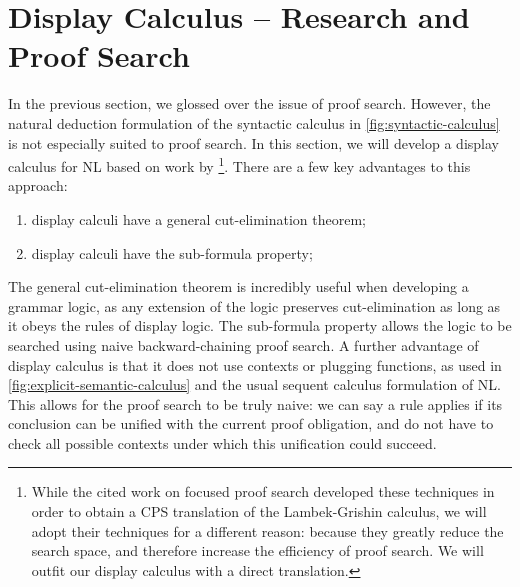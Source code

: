 \documentclass[a4paper]{article}
\begin{document}
\section{Display Calculus -- Research and Proof Search}\label{sec:display-calculus}
In the previous section, we glossed over the issue of proof
search. However, the natural deduction formulation of the syntactic
calculus in \autoref{fig:syntactic-calculus} is not especially suited
to proof search.
In this section, we will develop a display calculus
\citep{belnap1982} for NL based on work by
\citet{bernardi2010,bastenhof2012}\footnote{%
  While the cited work on focused proof search developed these
  techniques in order to obtain a CPS translation of the
  Lambek-Grishin calculus, we will adopt their techniques for a
  different reason: because they greatly reduce the search space, and
  therefore increase the efficiency of proof search. We will outfit
  our display calculus with a direct translation.
}. There are a few key advantages to this approach:
\begin{enumerate}
\item display calculi have a general cut-elimination theorem;
\item display calculi have the sub-formula property;
\end{enumerate}
The general cut-elimination theorem is incredibly useful when
developing a grammar logic, as any extension of the logic preserves
cut-elimination as long as it obeys the rules of display logic.
The sub-formula property allows the logic to be searched using naive
backward-chaining proof search. A further advantage of display
calculus is that it does not use contexts or plugging functions, as
used in \autoref{fig:explicit-semantic-calculus} and the usual sequent
calculus formulation of NL. This allows for the proof search to be
truly naive: we can say a rule applies if its conclusion can be
unified with the current proof obligation, and do not have to check
all possible contexts under which this unification could succeed.








\end{document}

